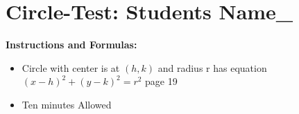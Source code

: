 \documentclass[12pt, a4paper, addpoints]{exam}
\begin{document}
\section*{Circle-Test:    \quad  Students Name_ \underline{\hspace{8cm}}}

\begin{mdframed}[backgroundcolor=gray!20] %
\textbf{Instructions and Formulas:}
\begin{itemize}
   

    \item  Circle  with center is at \( (h, k) \) and radius r has equation  \( (x - h)^2 + (y - k)^2 = r^2 \) page 19
    \item Ten minutes Allowed 

\end{itemize}
\end{mdframed}

\noindent 
\end{document}
